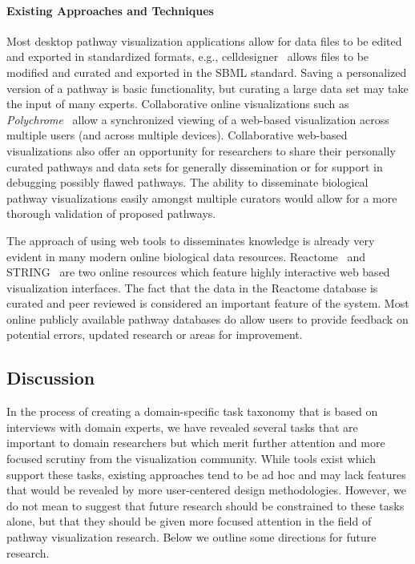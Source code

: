\documentclass[twocolumn]{bmcart}%
\begin{document}
\paragraph*{Existing Approaches and Techniques}
Most desktop pathway visualization applications allow for data files to be edited and exported in standardized formats, e.g., celldesigner~\cite{funahashi2008celldesigner} allows files to be modified and curated and exported in the SBML standard.
Saving a  personalized version of a pathway is basic functionality, but curating a large data set may take the input of many experts.
Collaborative online visualizations such as \textit{Polychrome}~\cite{badam2014polychrome} allow a synchronized viewing of a web-based visualization across multiple users (and across multiple devices).
Collaborative web-based visualizations also offer an opportunity for researchers to share their personally curated pathways and data sets for generally dissemination or for support in debugging possibly flawed pathways.
The ability to disseminate biological pathway visualizations easily amongst multiple curators would allow for a more thorough validation of proposed pathways.

The approach of using web tools to disseminates knowledge is already very evident in many modern online biological data resources.
Reactome~\cite{croft2014reactome} and STRING~\cite{STRING2005} are two online resources which feature highly interactive web based visualization interfaces.
The fact that the data in the Reactome database is curated and peer reviewed is considered an important feature of the system.
Most online publicly available pathway databases do allow users to provide feedback on potential errors, updated research or areas for improvement.

\subsection*{Discussion}

In the process of creating a domain-specific task taxonomy that is based on interviews with domain experts, we have revealed several tasks that are important to domain researchers but which merit further attention and more focused scrutiny from the visualization community.
While tools exist which support these tasks, existing approaches tend to be ad hoc and may lack features that would be revealed by more user-centered design methodologies.
However, we do not mean to suggest that future research should be constrained to these tasks alone, but that they should be given more focused attention in the field of pathway visualization research. Below we outline some directions for future research.
\end{document}
